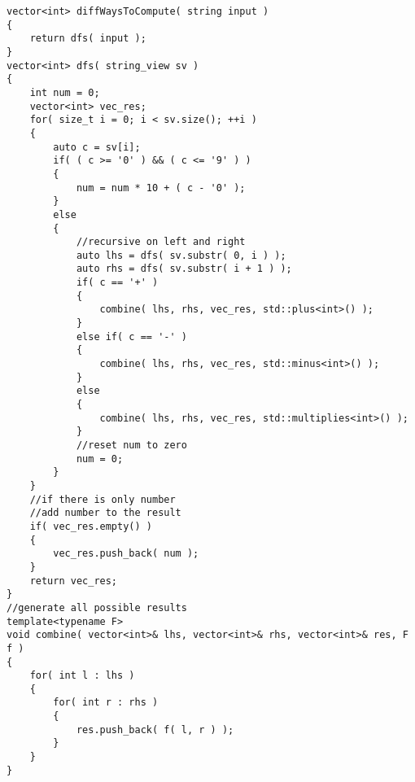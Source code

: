 \begin{lstlisting}[style=customc, caption={String View}]
vector<int> diffWaysToCompute( string input )
{
    return dfs( input );
}
vector<int> dfs( string_view sv )
{
    int num = 0;
    vector<int> vec_res;
    for( size_t i = 0; i < sv.size(); ++i )
    {
        auto c = sv[i];
        if( ( c >= '0' ) && ( c <= '9' ) )
        {
            num = num * 10 + ( c - '0' );
        }
        else
        {
            //recursive on left and right
            auto lhs = dfs( sv.substr( 0, i ) );
            auto rhs = dfs( sv.substr( i + 1 ) );
            if( c == '+' )
            {
                combine( lhs, rhs, vec_res, std::plus<int>() );
            }
            else if( c == '-' )
            {
                combine( lhs, rhs, vec_res, std::minus<int>() );
            }
            else
            {
                combine( lhs, rhs, vec_res, std::multiplies<int>() );
            }
            //reset num to zero
            num = 0;
        }
    }
    //if there is only number
    //add number to the result
    if( vec_res.empty() )
    {
        vec_res.push_back( num );
    }
    return vec_res;
}
//generate all possible results
template<typename F>
void combine( vector<int>& lhs, vector<int>& rhs, vector<int>& res, F f )
{
    for( int l : lhs )
    {
        for( int r : rhs )
        {
            res.push_back( f( l, r ) );
        }
    }
}
\end{lstlisting}